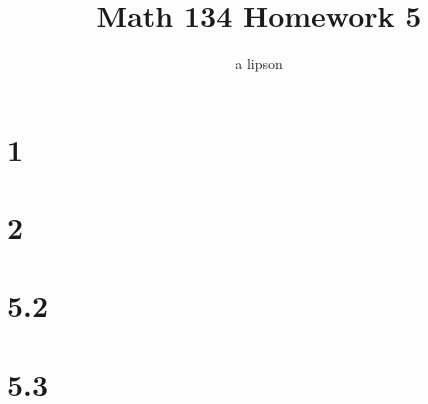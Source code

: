 \documentclass{article}
\title{Math 134 Homework 5}
\author{a lipson}
\begin{document}
\maketitle

\section*{1}


\section*{2}


\section*{5.2}


\section*{5.3}

\end{document}
